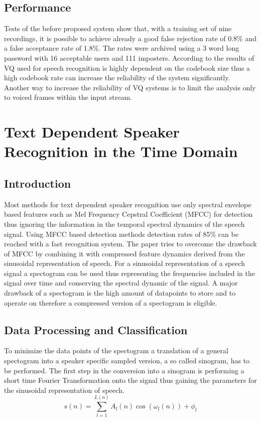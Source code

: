 \documentclass[12pt]{article}
\begin{document}
\subsection{Performance}
Tests of the before proposed system show that, with a training set of nine recordings, it is possible to achieve already a good false rejection rate of 0.8\% and a false acceptance rate of 1.8\%. The rates were archived using a 3 word long password with 16 acceptable users and 111 imposters. \cite{vq}  According to \cite{vq_2} the results of VQ used for speech recognition is highly dependent on the codebook size thus a high codebook rate can increase the reliability of the system significantly. Another way to increase the reliability of VQ systems is to limit the analysis only to voiced frames within the input stream.\cite{compare}
\newpage
\section{Text Dependent Speaker Recognition in the Time Domain}
\subsection{Introduction}
Most methods for text dependent speaker recognition use only spectral envelope based features such as Mel Frequency Cepstral Coefficient (MFCC) for detection thus ignoring the information in the temporal spectral  dynamics of the speech signal. Using MFCC based detection methods detection rates of 85\% can be reached with a fast recognition system. \cite{various_techniques} The paper \cite{sinogram} tries to overcome the drawback of MFCC by combining it with compressed feature dynamics derived from the sinusoidal representation of speech. 
For a sinusoidal representation of a speech signal a spectogram can be used thus representing the frequencies included in the signal over time and conserving the spectral dynamic of the signal. A major drawback of a spectogram is the high amount of datapoints to store and to operate on therefore a compressed version of a spectogram is eligible. 
\subsection{Data Processing and Classification}
To minimize the data points of the spectogram a translation of a general spectogram into a speaker specific sampled version, a so called sinogram, has to be performed. The first step in the conversion into a sinogram is performing a short time Fourier Transformation onto the signal thus gaining the parameters for the sinusoidal representation of speech.
\begin{equation}
s(n) = \sum_{l=1}^{L(n)}A_{l}(n)\cos(\omega_{l}(n))+\phi_{l}
\label{math:threshold}
\end{equation}
\end{document}
